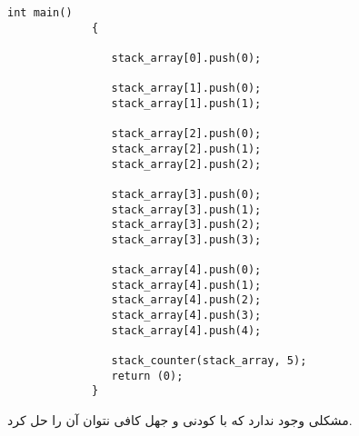 \begin{LTR}
\begin{lstlisting}[style=C++Style]
             int main()
             {

             	stack_array[0].push(0);

             	stack_array[1].push(0);
             	stack_array[1].push(1);

             	stack_array[2].push(0);
             	stack_array[2].push(1);
             	stack_array[2].push(2);

             	stack_array[3].push(0);
             	stack_array[3].push(1);
             	stack_array[3].push(2);
             	stack_array[3].push(3);

             	stack_array[4].push(0);
             	stack_array[4].push(1);
             	stack_array[4].push(2);
             	stack_array[4].push(3);
             	stack_array[4].push(4);

             	stack_counter(stack_array, 5);
             	return (0);
             }
        \end{lstlisting}
\end{LTR}

\begin{tcolorbox}
    مشکلی وجود ندارد که با کودنی و جهل کافی نتوان آن را حل کرد.
\end{tcolorbox}
